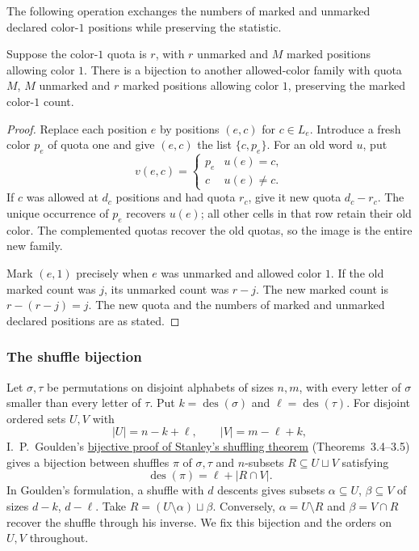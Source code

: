 The following operation exchanges the numbers of marked and unmarked
declared color-$1$ positions while preserving the statistic.

\begin{lemma}
Suppose the color-$1$ quota is $r$, with $r$ unmarked and $M$ marked
positions allowing color $1$. There is a bijection to another allowed-color
family with quota $M$, $M$ unmarked and $r$ marked positions allowing color
$1$, preserving the marked color-$1$ count.
\end{lemma}

\begin{proof}
Replace each position $e$ by positions $(e,c)$ for $c\in L_e$.
Introduce a fresh color $p_e$ of quota one and give $(e,c)$ the list
$\{c,p_e\}$. For an old word $u$, put
\[
 v(e,c)=\begin{cases}p_e&u(e)=c,\\c&u(e)\ne c.\end{cases}
\]
If $c$ was allowed at $d_c$ positions and had quota $r_c$, give it new
quota $d_c-r_c$. The unique occurrence of $p_e$ recovers $u(e)$;
all other cells in that row retain their old color. The complemented
quotas recover the old quotas, so the image is the entire new family.

Mark $(e,1)$ precisely when $e$ was unmarked and allowed color $1$.
If the old marked count was $j$, its unmarked count was $r-j$.
The new marked count is $r-(r-j)=j$. The new quota and the numbers of
marked and unmarked declared positions are as stated.
\end{proof}

\subsubsection[shuffleBijection]{The shuffle bijection}

Let $\sigma,\tau$ be permutations on disjoint alphabets of sizes $n,m$,
with every letter of $\sigma$ smaller than every letter of $\tau$.
Put $k=\operatorname{des}(\sigma)$ and $\ell=\operatorname{des}(\tau)$.
For disjoint ordered sets $U,V$ with
\[
 |U|=n-k+\ell,\qquad |V|=m-\ell+k,
\]
I.~P.~Goulden's
\href{https://uwaterloo.ca/math/sites/default/files/uploads/documents/gtams1985.pdf}{
bijective proof of Stanley's shuffling theorem}
(Theorems~3.4--3.5) gives a bijection between shuffles $\pi$ of
$\sigma,\tau$ and $n$-subsets $R\subseteq U\sqcup V$ satisfying
\[
 \operatorname{des}(\pi)=\ell+|R\cap V|.
\]
In Goulden's formulation, a shuffle with $d$ descents gives subsets
$\alpha\subseteq U$, $\beta\subseteq V$ of sizes $d-k$, $d-\ell$.
Take $R=(U\setminus\alpha)\sqcup\beta$. Conversely,
$\alpha=U\setminus R$ and $\beta=V\cap R$ recover the shuffle through
his inverse. We fix this bijection and the orders on $U,V$ throughout.

